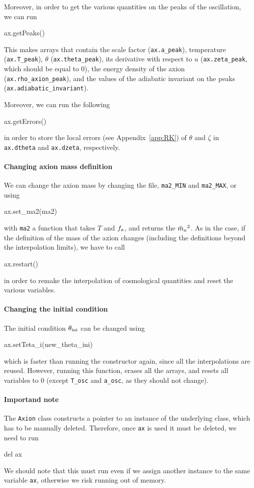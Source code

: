 \documentclass[11pt,a4paper]{article}
\begin{document}
Moreover, in order to get the various quantities on the peaks of the oscillation, we can run
%
\begin{py}
	ax.getPeaks()
\end{py}
%
This makes  arrays that contain the scale factor ({\tt ax.a\_peak}), temperature ({\tt ax.T\_peak}), $\theta$ ({\tt ax.theta\_peak}), its derivative with respect to $u$ ({\tt ax.zeta\_peak}, which should be equal to $0$), the energy density of the axion ({\tt ax.rho\_axion\_peak}), and the values of the adiabatic invariant on the peaks ({\tt ax.adiabatic\_invariant}).

Moreover, we can run the following
%
\begin{py}
	ax.getErrors()
\end{py}
%
in order to store the local errors (see Appendix~\ref{app:RK}) of $\theta$ and $\zeta$ in {\tt ax.dtheta} and {\tt ax.dzeta}, respectively. 

\paragraph{Changing axion mass definition}
%
We can change the axion mass by changing the file, {\tt ma2\_MIN} and {\tt ma2\_MAX}, or using 
%
\begin{cpp}
	ax.set_ma2(ma2)
\end{cpp}
%
with {\tt ma2} a function that takes $T$ and $f_{a}{}$, and returns the $\tilde m_{a}{}^2$. As in the \CPP case, if the definition of the mass of the axion changes (including the definitions beyond the interpolation limits), we have to call
%
\begin{cpp}
	ax.restart()
\end{cpp}
%
in order to remake the interpolation of cosmological quantities and reset the various variables.

\paragraph{Changing the initial condition}
%
The initial condition $\theta_{\rm ini}{}$ can be changed using 
%
\begin{py}
	ax.setTeta_i(new_theta_ini)
\end{py}
%
which is faster than running the constructor again, since all the interpolations are reused. However, running this function, erases all the arrays, and resets all variables to $0$ (except {\tt T\_osc} and {\tt a\_osc}, as they should not change). 

\paragraph{Importand note} The {\tt Axion} class constructs a pointer to an instance of the underlying  class, which has to be manually deleted. Therefore, once {\tt ax} is used it must be deleted, \ie we need to run 
%
\begin{py}
	del ax
\end{py}
%
We should note that this must run even if we assign another instance to the same variable {\tt ax}, otherwise we risk running out of memory.
\end{document}
